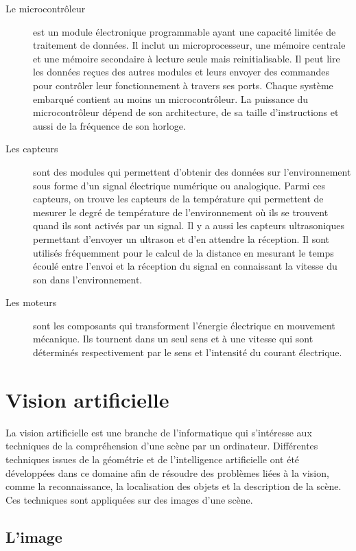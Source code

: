 \begin{description}
  \item[Le microcontrôleur] est un module électronique programmable ayant une
  capacité limitée de traitement de données. Il inclut un microprocesseur, une
  mémoire centrale et une mémoire secondaire à lecture seule mais reinitialisable.
  Il peut lire les données reçues des autres modules et leurs envoyer des commandes
  pour contrôler leur fonctionnement à travers ses ports. Chaque système embarqué
  contient au moins un microcontrôleur. La puissance du microcontrôleur
  dépend de son architecture, de sa taille d'instructions et aussi de la fréquence
  de son horloge.
  \item[Les capteurs] sont des modules qui permettent d'obtenir des données sur
  l'environnement sous forme d'un signal électrique numérique ou analogique.
  Parmi ces capteurs, on trouve les capteurs de la température qui permettent de
  mesurer le degré de température de l'environnement où ils se trouvent quand ils
  sont activés par un signal.
  Il y a aussi les capteurs ultrasoniques permettant d'envoyer un ultrason et
  d'en attendre la réception.
  Il sont utilisés fréquemment pour le calcul de la distance en mesurant le
  temps écoulé entre l'envoi et la réception du signal en connaissant la vitesse
  du son dans l'environnement.
  \item[Les moteurs] sont les composants qui transforment l'énergie électrique en
  mouvement mécanique. Ils tournent dans un seul sens et à une vitesse qui
  sont déterminés respectivement par le sens et l'intensité du courant électrique.
\end{description}

\section{Vision artificielle}

La vision artificielle est une branche de l'informatique qui s'intéresse aux
techniques de la compréhension d'une scène par un ordinateur. Différentes
techniques issues de la géométrie et de l'intelligence artificielle ont été
développées dans ce domaine afin de résoudre des problèmes liées à la vision,
comme la reconnaissance, la localisation des objets et la description de
la scène. Ces techniques sont appliquées sur des images d'une scène.

\subsection{L'image}


